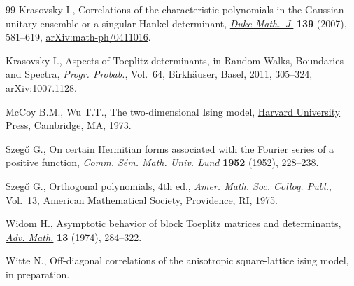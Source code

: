 \documentclass[pdftex]{sigma}
\numberwithin{equation}{section}
\begin{document}
\begin{thebibliography}{99}
Krasovsky I., Correlations of the characteristic polynomials in the
 {G}aussian unitary ensemble or a singular {H}ankel determinant, \href{https://doi.org/10.1215/S0012-7094-07-13936-X}{\textit{Duke
 Math.~J.}} \textbf{139} (2007), 581--619, \href{https://arxiv.org/abs/math-ph/0411016}{arXiv:math-ph/0411016}.

Krasovsky I., Aspects of {T}oeplitz determinants, in Random {W}alks,
 {B}oundaries and {S}pectra, \textit{Progr. Probab.}, Vol.~64,
 \href{https://doi.org/10.1007/978-3-0346-0244-0_16}{Birkh\"auser}, Basel, 2011, 305--324,
 \href{https://arxiv.org/abs/1007.1128}{arXiv:1007.1128}.

McCoy B.M., Wu T.T., The two-dimensional {I}sing model, \href{https://doi.org/10.4159/harvard.9780674180758}{Harvard University
 Press}, Cambridge, MA, 1973.

Szeg\H{o} G., On certain {H}ermitian forms associated with the {F}ourier series
 of a positive function, \textit{Comm. S\'em. Math. Univ. Lund} \textbf{1952} (1952), 228--238.

Szeg\H{o} G., Orthogonal polynomials, 4th ed., \textit{Amer. Math. Soc. Colloq.
 Publ.}, Vol.~13, American Mathematical Society, Providence, RI,
 1975.

Widom H., Asymptotic behavior of block {T}oeplitz matrices and determinants,
 \href{https://doi.org/10.1016/0001-8708(74)90072-3}{\textit{Adv. Math.}} \textbf{13} (1974), 284--322.

Witte N., Off-diagonal correlations of the anisotropic square-lattice ising
 model, in preparation.

\end{thebibliography}\LastPageEnding
\end{document}
